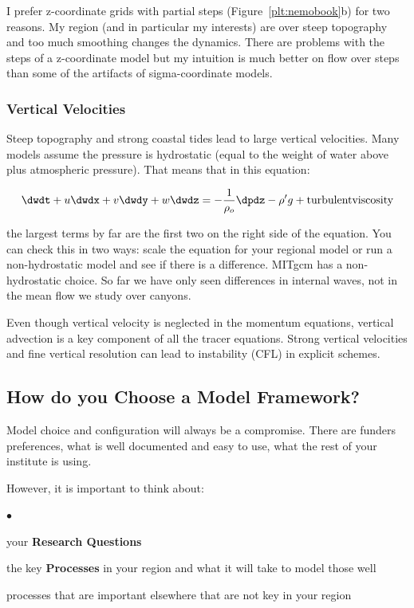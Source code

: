 \documentclass[letterpaper,12pt]{article}
\newcounter{lnum}
\newenvironment{abbrevlist}%
  {\begin{list}{$\bullet$}{\setlength{\leftmargin}{2em}%
               \setlength{\itemindent}{0em}%
               \setlength{\itemsep}{0pt}%
               \setlength{\parsep}{0pt}%
               \setlength{\topsep}{2pt}%
               \usecounter{lnum} } }{\end{list}}
\begin{document}
I prefer z-coordinate grids with partial steps (Figure~\ref{plt:nemobook}b) for two reasons.  My region (and in particular my interests) are over steep topography and too much smoothing changes the dynamics.  There are problems with the steps of a z-coordinate model but my intuition is much better on flow over steps than some of the artifacts of sigma-coordinate models.

\subsubsection*{Vertical Velocities}

Steep topography and strong coastal tides lead to large vertical velocities.  Many models assume the pressure is hydrostatic (equal to the weight of water above plus atmospheric pressure).  That means that in this equation:

\begin{equation}
\dwdt + u \dwdx + v \dwdy + w \dwdz = - \frac 1 {\rho_o} \dpdz - \rho^{\prime} g + {\rm turbulent viscosity}
\end{equation}

the largest terms by far are the first two on the right side of the equation.  You can check this in two ways: scale the equation for your regional model or run a non-hydrostatic model and see if there is a difference.  MITgcm has a non-hydrostatic choice.  So far we have only seen differences in internal waves, not in the mean flow we study over canyons.

Even though vertical velocity is neglected in the momentum equations, vertical advection is a key component of all the tracer equations.  Strong vertical velocities and fine vertical resolution can lead to instability (CFL) in explicit schemes.

\subsection{How do you Choose a Model Framework?}

Model choice and configuration will always be a compromise.  There are funders preferences, what is well documented and easy to use, what the rest of your institute is using.  

However, it is important to think about:
\begin{abbrevlist}
\item your {\bf Research Questions} 
\item the key {\bf Processes} in your region and what it will take to model those well
\item processes that are important elsewhere that are not key in your region
\end{abbrevlist}
\end{document}
